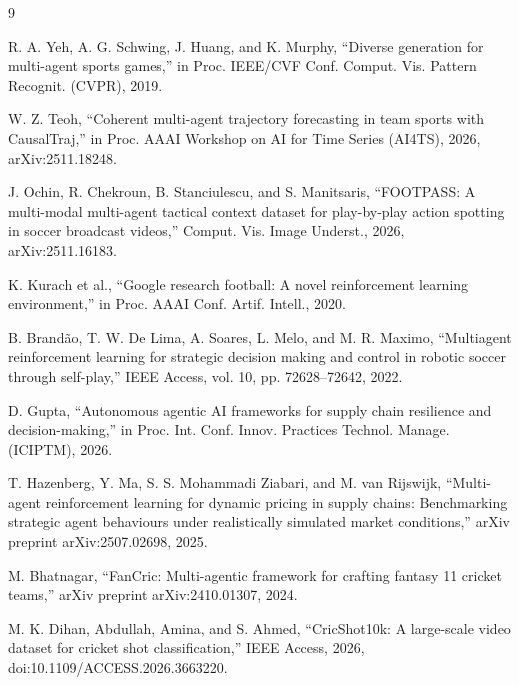 \begin{thebibliography}{9}

R. A. Yeh, A. G. Schwing, J. Huang, and K. Murphy, ``Diverse generation for multi-agent sports games,'' in Proc. IEEE/CVF Conf. Comput. Vis. Pattern Recognit. (CVPR), 2019.

W. Z. Teoh, ``Coherent multi-agent trajectory forecasting in team sports with CausalTraj,'' in Proc. AAAI Workshop on AI for Time Series (AI4TS), 2026, arXiv:2511.18248.

J. Ochin, R. Chekroun, B. Stanciulescu, and S. Manitsaris, ``FOOTPASS: A multi-modal multi-agent tactical context dataset for play-by-play action spotting in soccer broadcast videos,'' Comput. Vis. Image Underst., 2026, arXiv:2511.16183.

K. Kurach et al., ``Google research football: A novel reinforcement learning environment,'' in Proc. AAAI Conf. Artif. Intell., 2020.

B. Brand\~ao, T. W. De Lima, A. Soares, L. Melo, and M. R. Maximo, ``Multiagent reinforcement learning for strategic decision making and control in robotic soccer through self-play,'' IEEE Access, vol. 10, pp. 72628--72642, 2022.

D. Gupta, ``Autonomous agentic AI frameworks for supply chain resilience and decision-making,'' in Proc. Int. Conf. Innov. Practices Technol. Manage. (ICIPTM), 2026.

T. Hazenberg, Y. Ma, S. S. Mohammadi Ziabari, and M. van Rijswijk, ``Multi-agent reinforcement learning for dynamic pricing in supply chains: Benchmarking strategic agent behaviours under realistically simulated market conditions,'' arXiv preprint arXiv:2507.02698, 2025.

M. Bhatnagar, ``FanCric: Multi-agentic framework for crafting fantasy 11 cricket teams,'' arXiv preprint arXiv:2410.01307, 2024.

M. K. Dihan, Abdullah, Amina, and S. Ahmed, ``CricShot10k: A large-scale video dataset for cricket shot classification,'' IEEE Access, 2026, doi:10.1109/ACCESS.2026.3663220.

\end{thebibliography}
